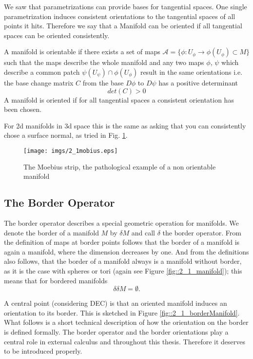 
We saw that parametrizations can provide bases for tangential spaces. One single parametrization induces consistent orientations to the tangential spaces of all points it hits. Therefore we say that a Manifold can be oriented if all tangential spaces can be oriented consistently.

\begin{definition} A manifold is orientable if there exists a set of maps $\mathcal A = \{\phi: U_\phi \to \phi(U_\phi) \subset M\}$ such that the maps describe the whole manifold and any two maps $\phi$, $\psi$ which describe a common patch $\psi(U_\psi) \cap \phi(U_\phi)$ result in the same orientations i.e. the base change matrix $C$ from the base $D\phi$ to $D\psi$ has a positive determinant
\[det(C) >0\]
A manifold is oriented if for all tangential spaces a consistent orientation has been chosen.

\end{definition}

For 2d manifolds in 3d space this is the same as asking that you can consistently chose a surface normal, as tried in Fig. \ref{fig::2_1_mobius}.

\begin{figure}[t]
\begin{center}
\texttt{[image: imgs/2\_1mobius.eps]}
\caption{The Moebius strip, the pathological example of a non orientable manifold}
\label{fig::2_1_mobius}
\end{center}
\end{figure}

\subsection{The Border Operator}
The border operator describes a special geometric operation for manifolds. 
We denote the border of a manifold $M$ by $\delta M$ and call $\delta$ the border operator. From the definition of maps at border points follows that the border of a manifold is again a manifold, where the dimension decreases by one. And from the definitions also follows, that the border of a manifold always is a manifold without border, as it is the case with spheres or tori (again see Figure \ref{fig::2_1_manifold}); this means that for bordered manifolds
\[\delta\delta M = \emptyset.\]

A central point (considering DEC) is that an oriented manifold induces an orientation to its border. This is sketched in Figure \ref{fig::2_1_borderManifold}.  What follows is a short technical description of how the orientation on the border is defined formally. The border operator and the border orientations play a central role in external calculus and throughout this thesis. Therefore it deserves to be introduced properly.

